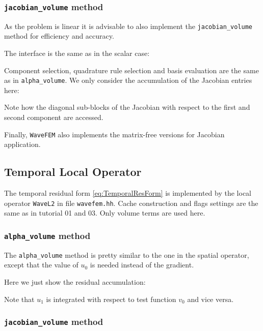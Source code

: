 \documentclass[a4paper,12pt]{article}
\begin{document}
\subsubsection*{\lstinline{jacobian_volume} method}

As the problem is linear it is advisable to also implement the
\lstinline{jacobian_volume} method for efficiency and accuracy.

The interface is the same as in the scalar case:


Component selection, quadrature rule selection and
basis evaluation are the same as in \lstinline{alpha_volume}.
We only consider the accumulation of the Jacobian entries here:

Note how the diagonal sub-blocks of the Jacobian with respect to
the first and second component are accessed.

Finally, \lstinline{WaveFEM} also implements the matrix-free versions
for Jacobian application.

\subsection{Temporal Local Operator}


The temporal residual form \eqref{eq:TemporalResForm} is
implemented by the local operator \lstinline{WaveL2} in
file \lstinline{wavefem.hh}. Cache construction and flags settings
are the same as in tutorial 01 and 03. Only volume terms are used here.

\subsubsection*{\lstinline{alpha_volume} method}

The \lstinline{alpha_volume} method is pretty similar
to the one in the spatial operator, except that the value of $u_0$
is needed instead of the gradient.

Here we just show the residual accumulation:

Note that $u_1$ is integrated with respect to test function $v_0$
and vice versa.

\subsubsection*{\lstinline{jacobian_volume} method}
\end{document}
